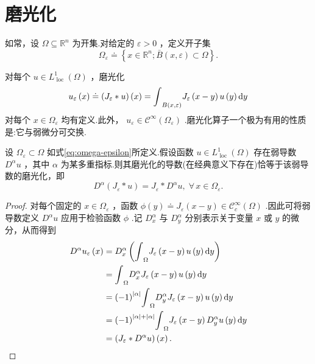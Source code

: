 \section{磨光化}

如常，设 $\Omega  \subseteq  {\mathbb{R}}^{n}$ 为开集.对给定的 $\varepsilon  > 0$ ，定义开子集
\begin{equation}\tag{8.12}\label{eq:omega-epsilon}
{\Omega }_{\varepsilon } \doteq  \left\{  {x \in  {\mathbb{R}}^{n};\bar{B}\left( {x,\varepsilon }\right)  \subset  \Omega }\right\}  .
\end{equation}

对每个 $u \in  {L}_{\text{ loc }}^{1}\left( \Omega \right)$ ，磨光化
\[
{u}_{\varepsilon }\left( x\right)  \doteq  \left( {{J}_{\varepsilon } * u}\right) \left( x\right)  = {\int }_{B\left( {x,\varepsilon }\right) }{J}_{\varepsilon }\left( {x - y}\right) u\left( y\right) {\mathop{}\!\mathrm{d} y}
\]
对每个 $x \in  {\Omega }_{\varepsilon }$ 均有定义.此外， ${u}_{\varepsilon } \in  {\mathcal{C}}^{\infty }\left( {\Omega }_{\varepsilon }\right)$ .磨光化算子一个极为有用的性质是:它与弱微分可交换.

\begin{lemma}[磨光化与弱导数可交换]\label{lem:mollification}
设 ${\Omega }_{\varepsilon } \subset  \Omega$ 如式\eqref{eq:omega-epsilon}所定义.假设函数 $u \in  {L}_{\text{ loc }}^{1}\left( \Omega \right)$ 存在弱导数 ${D}^{\alpha }u$ ，其中 $\alpha$ 为某多重指标.则其磨光化的导数(在经典意义下存在)恰等于该弱导数的磨光化，即
\begin{equation}\tag{8.13}\label{eq:mollification-derivative}
{D}^{\alpha }\left( {{J}_{\varepsilon } * u}\right)  = {J}_{\varepsilon } * {D}^{\alpha }u,\;\forall\,x \in  {\Omega }_{\varepsilon }.
\end{equation}
\end{lemma}

\begin{proof}
    对每个固定的 $x \in  {\Omega }_{\varepsilon }$ ，函数 $\phi \left( y\right)  \doteq  {J}_{\varepsilon }\left( {x - y}\right)\in{\mathcal{C}}_{c}^{\infty }\left( \Omega \right)$ .因此可将弱导数定义 ${D}^{\alpha }u$ 应用于检验函数 $\phi$ .记 ${D}_{x}^{\alpha }$ 与 ${D}_{y}^{\alpha }$ 分别表示关于变量 $x$ 或 $y$ 的微分，从而得到
{\setjot[-2]\begin{align*}
    {D}^{\alpha }{u}_{\varepsilon }\left( x\right) &= {D}_{x}^{\alpha }\left( {{\int }_{\Omega }{J}_{\varepsilon }\left( {x - y}\right) u\left( y\right) {\mathop{}\!\mathrm{d} y}}\right)\\
    &= {\int }_{\Omega }{D}_{x}^{\alpha }{J}_{\varepsilon }\left( {x - y}\right) u\left( y\right) {\mathop{}\!\mathrm{d} y}\\
    &= {\left( -1\right) }^{\left| \alpha \right| }{\int }_{\Omega }{D}_{y}^{\alpha }{J}_{\varepsilon }\left( {x - y}\right) u\left( y\right) {\mathop{}\!\mathrm{d} y}\\
    &= {\left( -1\right) }^{\left| \alpha \right|  + \left| \alpha \right| }{\int }_{\Omega }{J}_{\varepsilon }\left( {x - y}\right) {D}_{y}^{\alpha }u\left( y\right) {\mathop{}\!\mathrm{d} y}\\
    &= \left( {{J}_{\varepsilon } * {D}^{\alpha }u}\right) \left( x\right) .
\end{align*}}
\end{proof}

